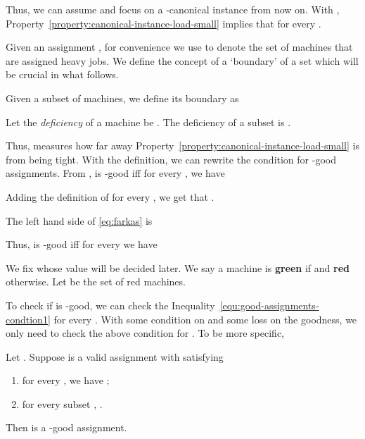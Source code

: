 \documentclass[11pt]{article}
\newenvironment{definition}{\begin{Definition}}{\end{Definition}}
\newtheorem{definition}[lemma]{Definition}
\newcounter{prop}
\newenvironment{properties}
{
\addtocounter{prop}{1}
\begin{enumerate}[labelindent=0pt,label=(\Alph{prop}\arabic*),itemindent=1em,itemsep=-1pt]
}
{
\end{enumerate}
}
\begin{document}
Thus, we can assume   and focus on a -canonical instance  from now on.  With , Property~\ref{property:canonical-instance-load-small} implies that  for every .

 Given an assignment , for convenience we use  to denote the set of machines that are assigned heavy jobs. We define the concept of a `boundary' of a set which will be crucial in what follows.

\def\bnd{{\tt bnd}}
\begin{definition}[Boundary of a set]
Given a subset  of machines, we define its boundary as 
 
\end{definition}

\begin{definition}
Let the \emph{deficiency} of a machine  be . The deficiency of a subset  is . 
\end{definition}

Thus,  measures how far away Property~\ref{property:canonical-instance-load-small} is from being tight.  With the definition, we can rewrite the condition for -good assignments.  From ,  is -good iff for every , we have 


Adding the definition of  for every , we get that  .

\ifdefined\CR
The left hand side of \eqref{eq:farkas} is

\else

\fi

Thus,   is -good iff for every  we have 


We fix  whose value will be decided later. We say a machine  is {\bf green} if   and {\bf red} otherwise.  Let  be the set of red machines.  


To check if  is -good, we can check the Inequality~\eqref{equ:good-assignments-condtion1} for every .   With some condition on  and some loss on the goodness, we only need to check the above condition for .  To be more specific,

\begin{lemma}
\label{lem:reduce-to-star}
Let .  Suppose  is a valid assignment with  satisfying
\begin{properties}
\item for every , we have ; \label{property:weight-to-x-small}
\item for every subset ,
. \label{eq:desire}
\end{properties}
Then  is a -good assignment.
\end{lemma}
\end{document}
